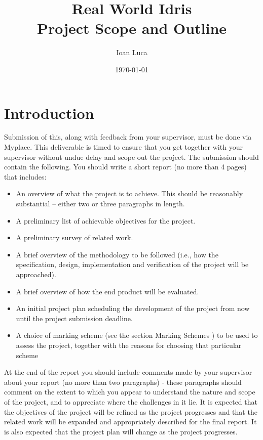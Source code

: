 \documentclass[a4paper]{report}
\begin{document}
\title{Real World Idris \\ Project Scope and Outline}
\author{Ioan Luca}
\date{\today}
\maketitle






\chapter{Introduction}
Submission of this, along with feedback from your supervisor, must be done
via Myplace.
This deliverable is timed to ensure that you get together with your
supervisor without undue delay and scope out the project.
The submission should contain the following.
You should write a short report (no more than 4 pages) that includes:
\begin{itemize}
	\item An overview of what the project is to achieve. This should be
	      reasonably
	      substantial
	      – either two or three paragraphs in length.
	\item A preliminary list of achievable objectives for the project.
	\item A preliminary survey of related work.
	\item A brief overview of the methodology to be followed
	      (i.e., how the specification, design, implementation and
	      verification
	      of the project will be approached).
	\item A brief overview of how the end product will be evaluated.
	\item An initial project plan scheduling the development of the project
	      from now until the
	      project submission deadline.
	\item A choice of marking scheme (see the section Marking Schemes ) to
	      be used to assess the
	      project, together with the reasons for choosing that particular
	      scheme
\end{itemize}
At the end of the report you should include comments made by your supervisor
about your report (no more than two paragraphs) - these paragraphs should
comment on the extent to which you appear to understand the nature and scope of the project, and to appreciate where the challenges in it lie.
It is expected that the objectives of the project will be refined as the project
progresses and that the related work will be expanded and appropriately described
for the final report. It is also expected that the project plan will change as the
project progresses.
\end{document}
